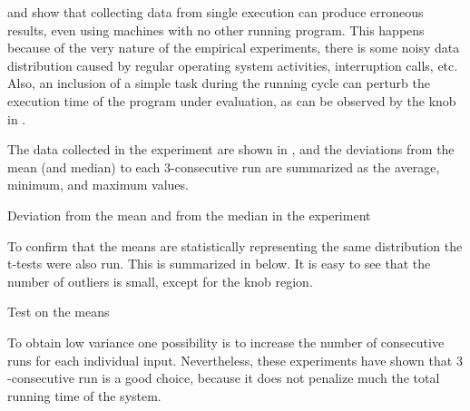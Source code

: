  and  show that collecting data from single execution can produce erroneous results, even using machines with no other running program. This happens because of the very nature of the empirical experiments, there is some noisy data distribution caused by regular operating system activities, interruption calls, etc. Also, an inclusion of a simple task during the running cycle can perturb the execution time of the program under evaluation, as can be observed by the knob in .

The data collected in the experiment are shown in , and the deviations from the mean (and median) to each $3$-consecutive run are summarized as the average, minimum, and maximum values.

\begin{table}
  \centering
  \begin{tiny}
  
  \end{tiny}
  \caption{Deviation from the mean and from the median in the experiment}
  \label{tab:simStats}
\end{table}

To confirm that the means are statistically representing the same distribution the t-tests were also run. This is summarized in  below. It is easy to see that the number of outliers is small, except for the knob region. 

\begin{table}
  \centering
  \begin{tiny}
  
  \end{tiny}
  \caption{Test on the means}
  \label{tab:statTest}
\end{table}

To obtain low variance one possibility is to increase the number of consecutive runs for each individual input. Nevertheless, these experiments have shown that $3$-consecutive run is a good choice, because it does not penalize much the total running time of the system.

